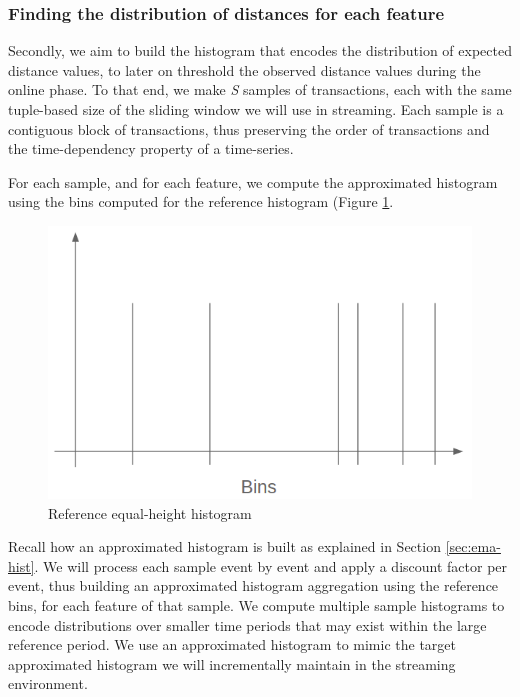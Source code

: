 \subsubsection*{Finding the distribution of distances for each feature}
Secondly, we aim to build the histogram that encodes the distribution of expected distance values, to later on threshold the observed distance values during the online phase. To that end, we make \textit{S} samples of transactions, each with the same tuple-based size of the sliding window we will use in streaming. Each sample is a contiguous block of transactions, thus preserving the order of transactions and the time-dependency property of a time-series. 

For each sample, and for each feature, we compute the approximated histogram using the bins computed for the reference histogram (Figure \ref{fig:ref-hist-bins}.

\begin{figure}[!htb]
    \begin{center}
      \includegraphics[scale=0.4]{figures/ref-bins.png}
      \caption[]{Reference equal-height histogram}
      \label{fig:ref-hist-bins}
    \end{center}
\end{figure}

Recall how an approximated histogram is built as explained in Section \ref{sec:ema-hist}. We will process each sample event by event and apply a discount factor per event, thus building an approximated histogram aggregation using the reference bins, for each feature of that sample. We compute multiple sample histograms to encode distributions over smaller time periods that may exist within the large reference period. We use an approximated histogram to mimic the target approximated histogram we will incrementally maintain in the streaming environment.

